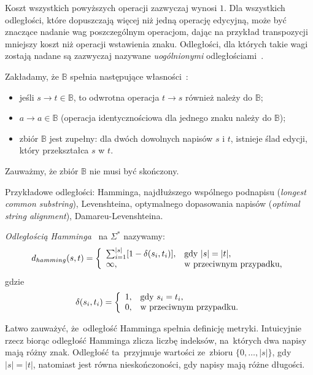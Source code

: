 \documentclass{praca1}
\begin{document}
Koszt wszystkich powyższych operacji zazwyczaj wynosi $1$. Dla wszystkich odległości, które dopuszczają więcej niż jedną operację edycyjną, może być znaczące nadanie wag poszczególnym operacjom, dając na przykład transpozycji mniejszy koszt niż operacji wstawienia znaku. Odległości, dla których takie wagi zostają nadane są zazwyczaj nazywane \emph{uogólnionymi} odległościami~\cite{Boytsov2011:indexingmethods}.

\begin{property}
Zakładamy, że $\mathbb{B}$ spełnia następujące własności~\cite{Boytsov2011:indexingmethods}:
\begin{itemize}
\item jeśli $s \rightarrow t \in \mathbb{B}$, to odwrotna operacja $t \rightarrow s$ również należy do $\mathbb{B}$;
\item $a \rightarrow a \in \mathbb{B}$ (operacja identycznościowa dla jednego znaku należy do $\mathbb{B}$);
\item zbiór $\mathbb{B}$ jest zupełny: dla dwóch dowolnych napisów $s$ i $t$, istnieje ślad edycji, który przekształca $s$ w $t$.
\end{itemize}
\end{property}

Zauważmy, że zbiór $\mathbb{B}$ nie musi być skończony.

Przykładowe odległości: Hamminga, najdłuższego wspólnego podnapisu (\emph{longest common substring}), Levenshteina, optymalnego dopasowania napisów (\emph{optimal string alignment}), Damareu-Levenshteina. 



\begin{definition}
\emph{Odległością Hamminga}~\cite{Hamming1950:errordetecting} na $\Sigma^*$ nazywamy:
$$
d_{hamming}(s, t) = \left\{
\begin{array}{l l}     
    \sum_{i=1}^{|s|}[1 - \delta(s_i, t_i)], & \text{gdy } |s| = |t|,\\
    \infty, & \text{w przeciwnym przypadku},
\end{array}\right.
$$
gdzie 
$$
\delta(s_i, t_i) = \left\{
\begin{array}{l l}     
    1, & \text{gdy } s_i = t_i,\\
    0, & \text{w przeciwnym przypadku}.
\end{array}\right.
$$
\end{definition}

Łatwo zauważyć, że~odległość Hamminga spełnia definicję metryki. Intuicyjnie rzecz biorąc odległość Hamminga zlicza liczbę indeksów, na~których dwa napisy mają różny znak. Odległość ta~przyjmuje wartości ze~zbioru $\{0,\ldots,|s|\}$, gdy $|s|=|t|$, natomiast jest równa nieskończoności, gdy napisy mają różne długości.
\end{document}
